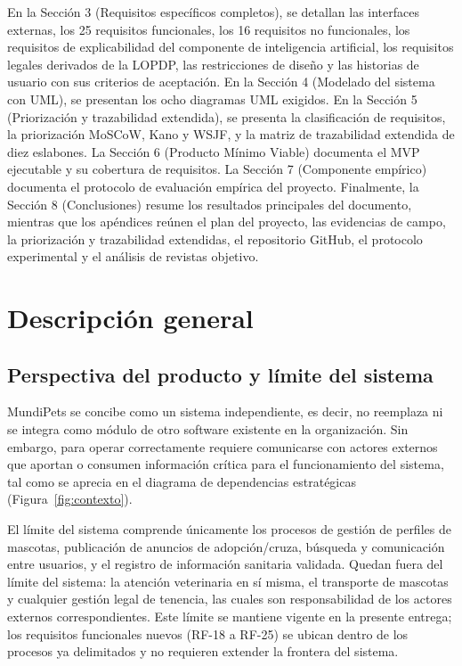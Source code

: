 \documentclass[journal,onecolumn]{IEEEtran}
\begin{document}
	En la Sección 3 (Requisitos específicos completos), se detallan las interfaces
	externas, los 25 requisitos funcionales, los 16 requisitos no funcionales, los
	requisitos de explicabilidad del componente de inteligencia artificial, los
	requisitos legales derivados de la LOPDP, las restricciones de diseño y las
	historias de usuario con sus criterios de aceptación. En la Sección 4
	(Modelado del sistema con UML), se presentan los ocho diagramas UML exigidos.
	En la Sección 5 (Priorización y trazabilidad extendida), se presenta la
	clasificación de requisitos, la priorización MoSCoW, Kano y WSJF, y la matriz
	de trazabilidad extendida de diez eslabones. La Sección 6 (Producto Mínimo
	Viable) documenta el MVP ejecutable y su cobertura de requisitos. La Sección 7
	(Componente empírico) documenta el protocolo de evaluación empírica del
	proyecto. Finalmente, la Sección 8 (Conclusiones) resume los resultados
	principales del documento, mientras que los apéndices reúnen el plan del
	proyecto, las evidencias de campo, la priorización y trazabilidad extendidas,
	el repositorio GitHub, el protocolo experimental y el análisis de revistas
	objetivo.
	
	\section{Descripción general}
	
	\subsection{Perspectiva del producto y límite del sistema}
	\label{sec:perspectiva}
	
	MundiPets se concibe como un sistema independiente, es decir, no reemplaza ni
	se integra como módulo de otro software existente en la organización. Sin
	embargo, para operar correctamente requiere comunicarse con actores externos
	que aportan o consumen información crítica para el funcionamiento del sistema,
	tal como se aprecia en el diagrama de dependencias estratégicas
	(Figura~\ref{fig:contexto}).
	
	El límite del sistema comprende únicamente los procesos de gestión de perfiles
	de mascotas, publicación de anuncios de adopción/cruza, búsqueda y
	comunicación entre usuarios, y el registro de información sanitaria validada.
	Quedan fuera del límite del sistema: la atención veterinaria en sí misma, el
	transporte de mascotas y cualquier gestión legal de tenencia, las cuales son
	responsabilidad de los actores externos correspondientes. Este límite se
	mantiene vigente en la presente entrega; los requisitos funcionales nuevos
	(RF-18 a RF-25) se ubican dentro de los procesos ya delimitados y no
	requieren extender la frontera del sistema.
	
\end{document}
